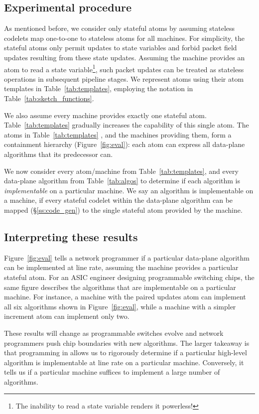 \subsection{Experimental procedure}
As mentioned before, we consider only stateful atoms by assuming stateless
codelets map one-to-one to stateless atoms for all \absmachine machines. For
simplicity, the stateful atoms only permit updates to state variables and
forbid packet field updates resulting from these state updates.  Assuming the
\absmachine machine provides an atom to read a state variable\footnote{The
inability to read a state variable renders it powerless!}, such packet updates
can be treated as stateless operations in subsequent pipeline stages. We
represent atoms using their atom templates in Table~\ref{tab:templates},
employing the notation in Table~\ref{tab:sketch_functions}.

We also assume every \absmachine machine provides exactly one stateful atom.
Table~\ref{tab:templates} gradually increases the capability of this single
atom.  The atoms in Table~\ref{tab:templates} , and the \absmachine machines
providing them, form a containment hierarchy (Figure~\ref{fig:eval}): each atom
can express all data-plane algorithms that its predecessor can.

We now consider every atom/\absmachine machine from Table~\ref{tab:templates},
and every data-plane algorithm from Table~\ref{tab:algos} to determine if each
algorithm is \textit{implementable} on a particular \absmachine machine. We
say an algorithm is implementable on a \absmachine machine, if every stateful
codelet within the data-plane algorithm can be mapped (\S\ref{ss:code_gen}) to
the single stateful atom provided by the \absmachine machine.

\subsection{Interpreting these results}
Figure~\ref{fig:eval} tells a network programmer if a particular data-plane
algorithm can be implemented at line rate, assuming the \absmachine machine
provides a particular stateful atom. For an ASIC engineer designing
programmable switching chips, the same figure describes the algorithms that are
implementable on a particular \absmachine machine. For instance, a \absmachine
machine with the paired updates atom can implement all six algorithms shown in
Figure~\ref{fig:eval}, while a machine with a simpler increment atom can
implement only two.

These results will change as programmable switches evolve and network
programmers push chip boundaries with new algorithms.  The larger takeaway is
that programming in \pktlanguage allows us to rigorously determine if a
particular high-level algorithm is implementable at line rate on a particular
\absmachine machine. Conversely, it tells us if a particular \absmachine
machine suffices to implement a large number of algorithms.
